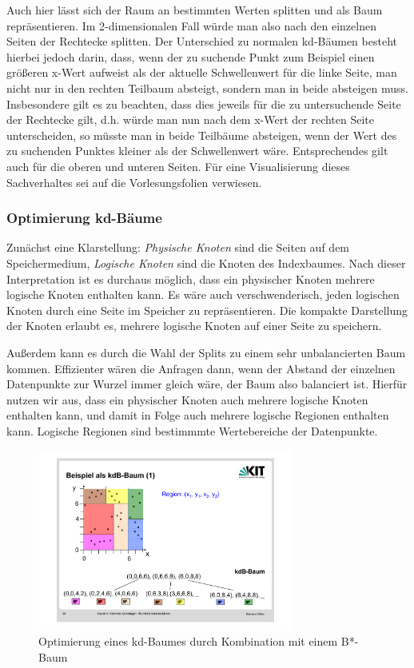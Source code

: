 Auch hier lässt sich der Raum an bestimmten Werten splitten und als Baum
repräsentieren. Im 2-dimensionalen Fall würde man also nach den einzelnen
Seiten der Rechtecke splitten. Der Unterschied zu normalen kd-Bäumen besteht
hierbei jedoch darin, dass, wenn der zu suchende Punkt zum Beispiel einen größeren
x-Wert aufweist als der aktuelle Schwellenwert
für die linke Seite, man nicht nur in den rechten
Teilbaum absteigt, sondern man in beide absteigen muss. Insbesondere gilt es zu
beachten, dass dies jeweils für die zu untersuchende Seite der Rechtecke gilt,
d.h. würde man nun nach dem x-Wert der rechten Seite unterscheiden, so müsste man
in beide Teilbäume absteigen, wenn der Wert des zu suchenden Punktes kleiner als
der Schwellenwert wäre. Entsprechendes gilt auch für die oberen und unteren
Seiten. Für eine Visualisierung dieses Sachverhaltes sei auf die Vorlesungsfolien
verwiesen.

\subsubsection{Optimierung kd-Bäume}
Zunächst eine Klarstellung: \textit{Physische Knoten} sind die Seiten auf dem
Speichermedium, \textit{Logische Knoten} sind die Knoten des Indexbaumes. Nach dieser
Interpretation ist es durchaus möglich, dass ein physischer Knoten mehrere logische
Knoten enthalten kann. Es wäre auch verschwenderisch, jeden logischen Knoten durch
eine Seite im Speicher zu repräsentieren. 
Die kompakte Darstellung der Knoten erlaubt es, mehrere logische Knoten auf einer
Seite zu speichern. 

Außerdem kann es durch die Wahl der Splits
zu einem sehr unbalancierten Baum kommen. Effizienter wären die Anfragen dann,
wenn der Abstand der einzelnen Datenpunkte zur Wurzel immer gleich wäre, der 
Baum also balanciert ist. Hierfür nutzen wir aus, dass ein physischer Knoten
auch mehrere logische Knoten enthalten kann, und damit in Folge auch mehrere 
logische Regionen enthalten kann. Logische Regionen sind bestimmmte Wertebereiche
der Datenpunkte.


\begin{figure}[htbp]
	\centering
	\includegraphics[width=0.75\textwidth]{Figures/kdB_Tree}
	\caption[kdB-Baum]{Optimierung eines kd-Baumes durch Kombination mit einem B*-Baum}
	\label{fig:kdB_Tree}
\end{figure}

